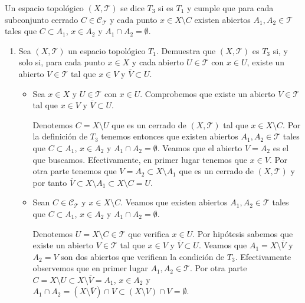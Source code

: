 \documentclass[12pt]{article}
\begin{document}
    \begin{ejercicio}
        Un espacio topológico $(X, \mathcal{T})$ se dice $T_3$ si es $T_1$ y cumple que para cada subconjunto cerrado $C \in \mathcal{C}_{\mathcal{T}}$ y cada punto $x \in X \setminus C$ existen abiertos $A_1, A_2 \in \mathcal{T}$ tales que $C \subset A_1$, $x \in A_2$ y $A_1 \cap A_2 = \emptyset$.
        
            \begin{enumerate}[label=\alph*)]
                \item Sea $(X, \mathcal{T})$ un espacio topológico $T_1$. Demuestra que $(X, \mathcal{T})$ es $T_3$ si, y solo si, para cada punto $x \in X$ y cada abierto $U \in \mathcal{T}$ con $x \in U$, existe un abierto $V \in \mathcal{T}$ tal que $x \in V$ y $\overline{V} \subset U$.
    
                    \begin{itemize}[leftmargin=*]
                \item[$\implies$] Sea $x\in X$ y $U\in\mathcal{T}$ con $x\in U$. Comprobemos que existe un abierto $V\in\mathcal{T}$ tal que $x\in V$ y $\overline{V}\subset U$.
                
                Denotemos $C=X\setminus U$ que es un cerrado de $(X,\mathcal{T})$ tal que $x\in X\setminus C$. Por la definición de $T_3$ tenemos entonces que existen abiertos $A_1, A_2\in\mathcal{T}$ tales que $C\subset A_1$, $x\in A_2$ y $A_1\cap A_2=\emptyset$. Veamos que el abierto $V=A_2$ es el que buscamos. Efectivamente, en primer lugar tenemos que $x\in V$. Por otra parte tenemos que $V=A_2\subset X\setminus A_1$ que es un cerrado de $(X,\mathcal{T})$ y por tanto $\overline{V}\subset X\setminus A_1\subset X\setminus C=U$.
    
                \item[$\impliedby$] Sean $C\in\mathcal{C}_{\mathcal{T}}$ y $x\in X\setminus C$. Veamos que existen abiertos $A_1, A_2\in\mathcal{T}$ tales que $C\subset A_1$, $x\in A_2$ y $A_1\cap A_2=\emptyset$.
                
                Denotemos $U=X\setminus C\in\mathcal{T}$ que verifica $x\in U$. Por hipótesis sabemos que existe un abierto $V\in\mathcal{T}$ tal que $x\in V$ y $\overline{V}\subset U$. Veamos que $A_1=X\setminus\overline{V}$ y $A_2=V$ son dos abiertos que verifican la condición de $T_3$. Efectivamente observemos que en primer lugar $A_1, A_2\in\mathcal{T}$. Por otra parte $C=X\setminus U\subset X\setminus\overline{V}=A_1$, $x\in A_2$ y $A_1\cap A_2=(X\setminus\overline{V})\cap V\subset(X\setminus V)\cap V=\emptyset$.
            \end{itemize}
        

\end{enumerate}
\end{ejercicio}
\end{document}
